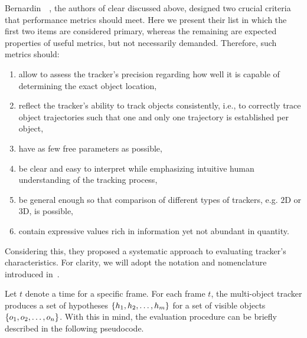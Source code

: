 Bernardin~\etal{}~\cite{bernardin2008clearmot}, the authors of \gls{clear} discussed above, designed two crucial criteria that performance metrics should meet. Here we present their list in which the first two items are considered primary, whereas the remaining are expected properties of useful metrics, but not necessarily demanded. Therefore, such metrics should:
\begin{enumerate}
    \item allow to assess the tracker's precision regarding how well it is capable of determining the exact object location,
    \item reflect the tracker's ability to track objects consistently, i.e., to correctly trace object trajectories such that one and only one trajectory is established per object,
    \item have as few free parameters as possible,
    \item be clear and easy to interpret while emphasizing intuitive human understanding of the tracking process,
    \item be general enough so that comparison of different types of trackers, e.g. $2$D or $3$D, is possible,
    \item contain expressive values rich in information yet not abundant in quantity.
\end{enumerate}

Considering this, they proposed a systematic approach to evaluating tracker's characteristics. For clarity, we will adopt the notation and nomenclature introduced in~\cite{bernardin2008clearmot}.

Let $t$ denote a time for a specific frame. For each frame $t$, the multi-object tracker produces a set of hypotheses $\left\{ {h_1, h_2, \dots, h_m} \right\}$ for a set of visible objects $\left\{ {o_1, o_2, \dots, o_n} \right\}$. With this in mind, the evaluation procedure can be briefly described in the following pseudocode.

